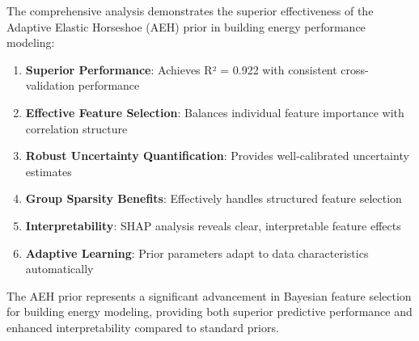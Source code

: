 The comprehensive analysis demonstrates the superior effectiveness of the Adaptive Elastic Horseshoe (AEH) prior in building energy performance modeling:

\begin{enumerate}
    \item \textbf{Superior Performance}: Achieves R² = 0.922 with consistent cross-validation performance
    \item \textbf{Effective Feature Selection}: Balances individual feature importance with correlation structure
    \item \textbf{Robust Uncertainty Quantification}: Provides well-calibrated uncertainty estimates
    \item \textbf{Group Sparsity Benefits}: Effectively handles structured feature selection
    \item \textbf{Interpretability}: SHAP analysis reveals clear, interpretable feature effects
    \item \textbf{Adaptive Learning}: Prior parameters adapt to data characteristics automatically
\end{enumerate}

The AEH prior represents a significant advancement in Bayesian feature selection for building energy modeling, providing both superior predictive performance and enhanced interpretability compared to standard priors. 
